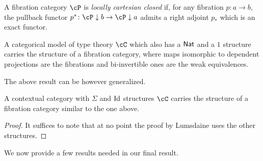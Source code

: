 \begin{defn}
  A fibration category $\cP$ is \emph{locally cartesian closed} if, for any
  fibration $p\colon a\rightarrow b$, the pullback functor
  $p^*\colon\cP\downarrow b\rightarrow\cP\downarrow a$ admits a right adjoint
  $p_*$ which is an exact functor.
\end{defn}

\begin{prop}
  A categorical model of type theory $\cC$ which also has a $\operatorname{\mathsf{Nat}}$ and a $1$
  structure carries the structure of a fibration category, where maps isomorphic
  to dependent projections are the fibrations and bi-invertible ones are the
  weak equivalences.
\end{prop}

The above result can be however generalized.

\begin{prop}
  A contextual category with $\Sigma$ and $\operatorname{Id}$ structures $\cC$ carries the
  structure of a fibration category similar to the one above.
\end{prop}
\begin{proof}
  It suffices to note that at no point the proof by Lumsdaine uses the other
  structures.
\end{proof}

We now provide a few results needed in our final result.

